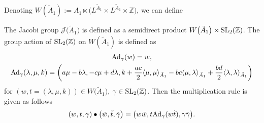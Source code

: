 \documentclass[pdftex]{sigma}%
\numberwithin{equation}{section}
\newcommand{\Ja}{\mathcal{J}}
\begin{document}
Denoting $W(\tilde A_1):=A_1\ltimes \big(L^{\tilde A_1}\times L^{\tilde A_1}\times \mathbb{Z}\big)$, we can define
\begin{Definition}
The Jacobi group $\Ja\big(\tilde A_1\big)$ is defined as a semidirect product $W\big(\tilde A_1\big)\rtimes {\rm SL}_2(\mathbb{Z})$. The group action of ${\rm SL}_2(\mathbb{Z})$ on $W(\tilde A_1)$ is defined as
\begin{gather*}
{\rm Ad}_{\gamma}(w)=w,
\\
{\rm Ad}_{\gamma}(\lambda,\mu,k)=\left(a\mu-b\lambda,-c\mu+d\lambda,k+\frac{ac}{2}\langle \mu,\mu \rangle_{\tilde A_1}-bc\langle \mu,\lambda\rangle_{\tilde A_1}+\frac{bd}{2}\langle\lambda,\lambda\rangle_{\tilde A_1}\right)
\end{gather*}
for $(w,t=(\lambda,\mu,k))\in W\big(\tilde A_1\big)$, $\gamma \in {\rm SL}_2(\mathbb{Z})$. Then the multiplication rule is given as follows
\begin{gather*}
(w,t,\gamma)\bullet\big(\tilde w,\tilde t,\tilde \gamma\big)=\big(w\tilde w,t{\rm Ad}_{\gamma}(w\tilde t),\gamma\tilde\gamma\big).
\end{gather*}
\end{Definition}
\end{document}
